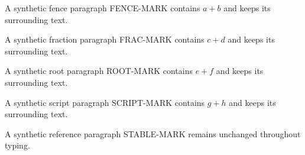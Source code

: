 \documentclass{article}
\begin{document}
\rule[-10pt]{0pt}{30pt} A synthetic fence paragraph FENCE-MARK contains $a+b$ and keeps its surrounding text.

\rule[-10pt]{0pt}{30pt} A synthetic fraction paragraph FRAC-MARK contains $c+d$ and keeps its surrounding text.

\rule[-10pt]{0pt}{30pt} A synthetic root paragraph ROOT-MARK contains $e+f$ and keeps its surrounding text.

\rule[-10pt]{0pt}{30pt} A synthetic script paragraph SCRIPT-MARK contains $g+h$ and keeps its surrounding text.

\rule[-10pt]{0pt}{30pt} A synthetic reference paragraph STABLE-MARK remains unchanged throughout typing.
\end{document}
